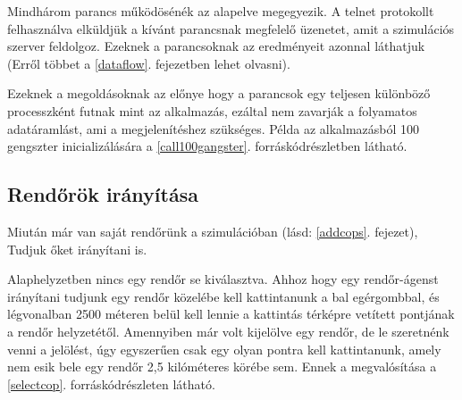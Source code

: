\documentclass[a4paper,12pt]{report}
\begin{document}






Mindhárom parancs működösénék az alapelve megegyezik. A telnet protokollt felhasználva elküldjük a kívánt parancsnak megfelelő üzenetet, amit a szimulációs szerver feldolgoz. Ezeknek a parancsoknak az eredményeit azonnal láthatjuk (Erről többet a \ref{dataflow}. fejezetben lehet olvasni).

\vspace{2mm}
Ezeknek a megoldásoknak az előnye hogy a parancsok egy teljesen különböző processzként futnak mint az alkalmazás, ezáltal nem zavarják a folyamatos adatáramlást, ami a megjelenítéshez szükséges. Példa az alkalmazásból 100 gengszter inicializálására a \ref{call100gangster}. forráskódrészletben látható.



\subsection{Rendőrök irányítása}
\label{controlcops}

Miután már van saját rendőrünk a szimulációban (lásd: \ref{addcops}. fejezet), Tudjuk őket irányítani is.

\vspace{2mm}
Alaphelyzetben nincs egy rendőr se kiválasztva. Ahhoz hogy egy rendőr-ágenst irányítani tudjunk egy rendőr közelébe kell kattintanunk a bal egérgombbal, és légvonalban 2500 méteren belül kell lennie a kattintás térképre vetített pontjának a rendőr helyzetétől. Amennyiben már volt kijelölve egy rendőr, de le szeretnénk venni a jelölést, úgy egyszerűen csak egy olyan pontra kell kattintanunk, amely nem esik bele egy rendőr 2,5 kilóméteres körébe sem. Ennek a megvalósítása a \ref{selectcop}. forráskódrészleten látható.


\end{document}
